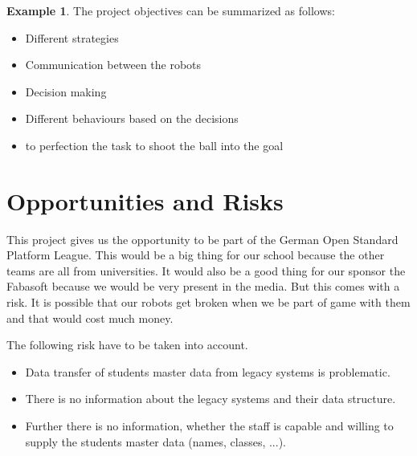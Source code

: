 \documentclass[12pt]{article}
\theoremstyle{definition}
\newtheorem{example}{Example}
\newenvironment{explanation}{%
   \setlength{\parindent}{0pt}
   \itshape
   \color{blue}
}{}
\begin{document}
\begin{example}
The project objectives can be summarized as follows:
\begin{itemize}
\item Different strategies 
\item Communication between the robots
\item Decision making
\item Different behaviours based on the decisions
\item to perfection the task to shoot the ball into the goal
\end{itemize}
\end{example}

\pagebreak
\section{Opportunities and Risks}
\begin{explanation}
This project gives us the opportunity to be part of the German Open Standard Platform League. This would be a big thing for our school because the other teams are all from universities. It would also be a good thing for our sponsor the Fabasoft because we would be very present in the media. But this comes with a risk. It is possible that our robots get broken when we be part of game with them and that would cost much money.
\end{explanation}


The following risk have to be taken into account.
\begin{itemize}
\item Data transfer of students master data from legacy systems is problematic.
\item There is no information about the legacy systems and their data structure.
\item Further there is no information, whether the staff is capable and willing to supply the students master data (names, classes, ...).
\end{itemize}


\pagebreak
\end{document}

